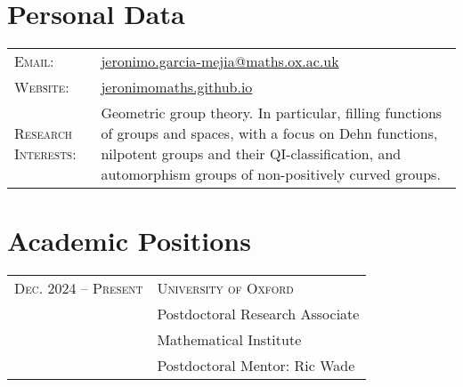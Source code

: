\documentclass[a4paper,11pt]{article} %
\begin{document}
\pagestyle{empty} %


\par{\bigskip\par} %

\section{Personal Data}

\begin{longtable}{>{\raggedleft\arraybackslash}p{4cm}p{10cm}}
\textsc{Email:} & \href{mailto:jeronimo.garcia-mejia@maths.ox.ac.uk}{jeronimo.garcia-mejia@maths.ox.ac.uk}\\
\textsc{Website:} & \href{https://jeronimomaths.github.io}{jeronimomaths.github.io} \\
\textsc{Research Interests:} & Geometric group theory. In particular, filling functions of groups and spaces, with a focus on Dehn functions, nilpotent groups and their QI-classification, and automorphism groups of non-positively curved groups.\end{longtable}

\section{Academic Positions}

\begin{longtable}{>{\raggedleft\arraybackslash}p{4cm}p{10cm}}
\textsc{Dec. 2024 -- Present} & \textsc{University of Oxford} \vspace{0.2em} \\
& Postdoctoral Research Associate \\
& Mathematical Institute \\
& \quad Postdoctoral Mentor: Ric Wade
\end{longtable}
\end{document}
